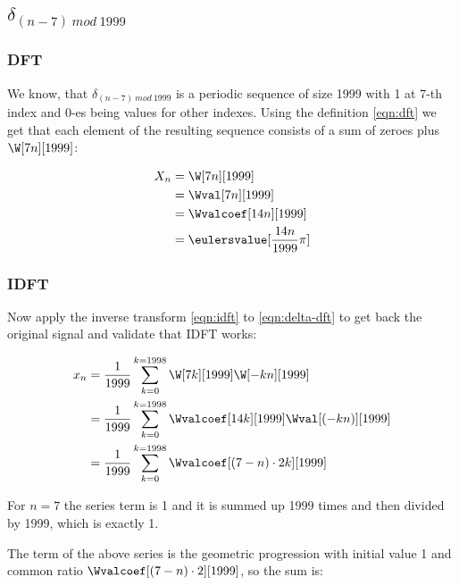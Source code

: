 \documentclass[a4paper]{article}
\theoremstyle{break}
\theoremstyle{break}
\begin{document}
\subsection{$\delta_{(n - 7)\ mod\ 1999}$}

\subsubsection{DFT}

We know, that $\delta_{(n - 7)\ mod\ 1999}$ is a periodic sequence of size 1999 with 1 at 7-th index and 0-es being values for other indexes. Using the definition \eqref{eqn:dft} we get that each element of the resulting sequence consists of a sum of zeroes plus $\W[7n][1999]$:

\begin{equation} \label{eqn:delta-dft}
  \begin{split}
    X_n &= \W[7n][1999] \\
        &= \Wval[7n][1999] \\
        &= \Wvalcoef[14n][1999] \\
        &= \eulersvalue[\frac{14n}{1999}\pi]
  \end{split}
\end{equation}

\subsubsection{IDFT}

Now apply the inverse transform \eqref{eqn:idft} to \eqref{eqn:delta-dft} to get back the original signal and validate that IDFT works:

\begin{equation*}
  \begin{split}
    x_n &= \frac{1}{1999} \sum_{k = 0}^{k = 1998} \W[7k][1999] \W[-kn][1999] \\
        &= \frac{1}{1999} \sum_{k = 0}^{k = 1998} \Wvalcoef[14k][1999] \Wval[(-kn)][1999] \\
        &= \frac{1}{1999} \sum_{k = 0}^{k = 1998} \Wvalcoef[(7 - n) \cdot 2k][1999]
  \end{split}
\end{equation*}


For $n = 7$ the series term is 1 and it is summed up 1999 times and then divided by 1999, which is exactly 1.

The term of the above series is the geometric progression with initial value 1 and common ratio $\Wvalcoef[(7 - n) \cdot 2][1999]$, so the sum is:
\end{document}
